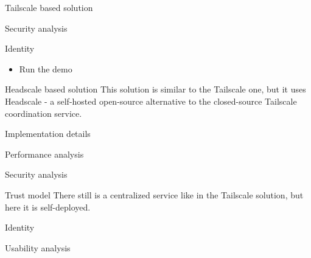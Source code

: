 \begin{frame}{Tailscale based solution}
\begin{block}{Security analysis}
\begin{block}{Identity}
\begin{itemize}
  \begin{itemize}
  \tightlist
  \item
    add -P \$HOST:\$PORT for each party using their Tailscale
    hostname/virtual IP
  \end{itemize}
\item
  Run the demo
\end{itemize}
\end{block}
\end{block}
\end{frame}

\hypertarget{thesis__080-headscale.md}{}
\begin{frame}{Headscale based solution}
\protect\hypertarget{thesis__080-headscale.md__headscale-based-solution}{}
This solution is similar to the Tailscale one, but it uses Headscale - a
self-hosted open-source alternative to the closed-source Tailscale
coordination service.

\begin{block}{Implementation details}
\protect\hypertarget{thesis__080-headscale.md__implementation-details}{}
\end{block}

\begin{block}{Performance analysis}
\protect\hypertarget{thesis__080-headscale.md__performance-analysis}{}
\end{block}

\begin{block}{Security analysis}
\protect\hypertarget{thesis__080-headscale.md__security-analysis}{}
\begin{block}{Trust model}
\protect\hypertarget{thesis__080-headscale.md__trust-model}{}
There still is a centralized service like in the Tailscale solution, but
here it is self-deployed.
\end{block}

\begin{block}{Identity}
\protect\hypertarget{thesis__080-headscale.md__identity}{}
\end{block}
\end{block}

\begin{block}{Usability analysis}
\protect\hypertarget{thesis__080-headscale.md__usability-analysis}{}
\end{block}
\end{frame}
